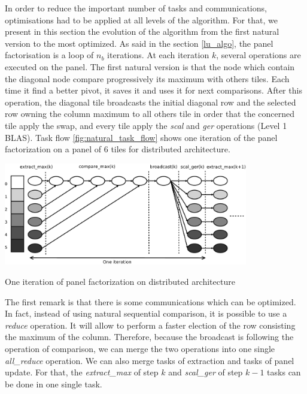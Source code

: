 In order to reduce the important number of tasks and communications, optimisations had to be applied at all levels of the algorithm. For that, we present in this section the evolution of the algorithm from the first natural version to the most optimized. As said in the section \ref{lu_algo}, the panel factorisation is a loop of $n_b$ iterations. At each iteration $k$, several operations are executed on the panel.
The first natural version is that the node which contain the diagonal node compare progressively its maximum with others tiles. Each time it find a better pivot, it saves it and uses it for next comparisons. After this operation, the diagonal tile broadcasts the initial diagonal row and the selected row owning the column maximum to all others tile in order that the concerned tile apply the swap, and every tile apply the \emph{scal} and \emph{ger} operations (Level 1 BLAS). Task flow \ref{fig:natural_task_flow} shows one iteration of the panel factorization on a panel of 6 tiles for distributed architecture.

\begin{taskflow}[!ht]
\centering
\includegraphics[width=0.8\textwidth]{figures/natural_tf_bw.pdf}
\caption{One iteration of panel factorization on distributed architecture \label{fig:natural_task_flow}}
\end{taskflow}

The first remark is that there is some communications which can be optimized. In fact, instead of using natural sequential comparison, it is possible to use a \emph{reduce} operation. It will allow to perform a faster election of the row consisting the maximum of the column. Therefore, because the broadcast is following the operation of comparison, we can merge the two operations into one single \textit{all\_reduce} operation.
We can also merge tasks of extraction and tasks of panel update. For that, the \emph{extract\_max} of step $k$ and \emph{scal\_ger} of step $k-1$ tasks can be done in one single task.

